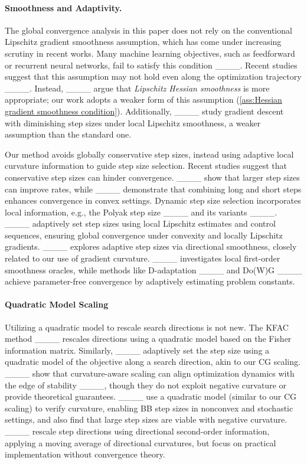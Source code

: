 \vspace{-1mm}
\paragraph{Smoothness and Adaptivity.} 
The global convergence analysis in this paper does not rely on the conventional Lipschitz gradient smoothness assumption, which has come under increasing scrutiny in recent works. Many machine learning objectives, such as feedforward or recurrent neural networks, fail to satisfy this condition ____. Recent studies suggest that this assumption may not hold even along the optimization trajectory ____. Instead, ____ argue that {\em Lipschitz Hessian smoothness} is more appropriate; our work adopts a weaker form of this assumption (\cref{ass:Hessian gradient smoothness condition}). Additionally, ____ study gradient descent with diminishing step sizes under local Lipschitz smoothness, a weaker assumption than the standard one.

Our method avoids globally conservative step sizes, instead using adaptive local curvature information to guide step size selection. Recent studies suggest that conservative step sizes can hinder convergence. ____ show that larger step sizes can improve rates, while ____ demonstrate that combining long and short steps enhances convergence in convex settings. Dynamic step size selection incorporates local information, e.g., the Polyak step size ____ and its variants ____. ____ adaptively set step sizes using local Lipschitz estimates and control sequences, ensuring global convergence under convexity and locally Lipschitz gradients. ____ explores adaptive step sizes via directional smoothness, closely related to our use of gradient curvature. ____ investigates local first-order smoothness oracles, while methods like D-adaptation ____ and Do(W)G ____ achieve parameter-free convergence by adaptively estimating problem constants.

\vspace{-1mm}
\paragraph{Quadratic Model Scaling } 

Utilizing a quadratic model to rescale search directions is not new. The KFAC method ____ rescales directions using a quadratic model based on the Fisher information matrix. Similarly,  ____ adaptively set the step size using a quadratic model of the objective along a search direction, akin to our CG scaling. ____ show that curvature-aware scaling can align optimization dynamics with the edge of stability ____, though they do not exploit negative curvature or provide theoretical guarantees. ____ use a quadratic model (similar to our CG scaling) to verify curvature, enabling BB step sizes in nonconvex and stochastic settings, and also find that large step sizes are viable with negative curvature. ____ rescale step directions using directional second-order information, applying a moving average of directional curvatures, but focus on practical implementation without convergence theory.